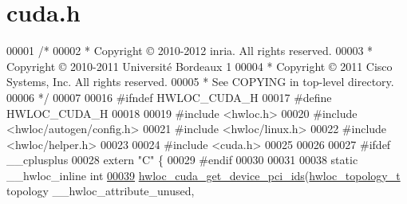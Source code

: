 \hypertarget{a00028_source}{
\section{cuda.h}
}

\begin{DoxyCode}
00001 \textcolor{comment}{/*}
00002 \textcolor{comment}{ * Copyright © 2010-2012 inria.  All rights reserved.}
00003 \textcolor{comment}{ * Copyright © 2010-2011 Université Bordeaux 1}
00004 \textcolor{comment}{ * Copyright © 2011 Cisco Systems, Inc.  All rights reserved.}
00005 \textcolor{comment}{ * See COPYING in top-level directory.}
00006 \textcolor{comment}{ */}
00007 
00016 \textcolor{preprocessor}{#ifndef HWLOC\_CUDA\_H}
00017 \textcolor{preprocessor}{}\textcolor{preprocessor}{#define HWLOC\_CUDA\_H}
00018 \textcolor{preprocessor}{}
00019 \textcolor{preprocessor}{#include <hwloc.h>}
00020 \textcolor{preprocessor}{#include <hwloc/autogen/config.h>}
00021 \textcolor{preprocessor}{#include <hwloc/linux.h>}
00022 \textcolor{preprocessor}{#include <hwloc/helper.h>}
00023 
00024 \textcolor{preprocessor}{#include <cuda.h>}
00025 
00026 
00027 \textcolor{preprocessor}{#ifdef \_\_cplusplus}
00028 \textcolor{preprocessor}{}\textcolor{keyword}{extern} \textcolor{stringliteral}{"C"} \{
00029 \textcolor{preprocessor}{#endif}
00030 \textcolor{preprocessor}{}
00031 
00038 \textcolor{keyword}{static} \_\_hwloc\_inline \textcolor{keywordtype}{int}
\hypertarget{a00028_source_l00039}{}\hyperlink{a00070_gae45c92fbc7ac538cf69fdfcc73994ed9}{00039} \hyperlink{a00070_gae45c92fbc7ac538cf69fdfcc73994ed9}{hwloc_cuda_get_device_pci_ids}(\hyperlink{a00039_ga9d1e76ee15a7dee158b786c30b6a6e38}{hwloc_topology_t} topology \_\_hwloc\_attribute\_unused,
      

\end{DoxyCode}
